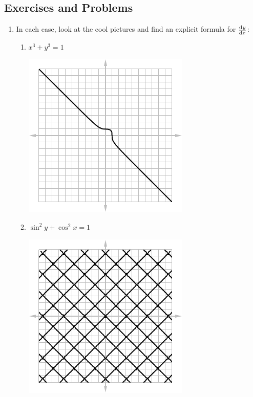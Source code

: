 \subsection{Exercises and Problems}
\begin{enumerate}
  \item In each case, look at the cool pictures and find an explicit formula for $ \od{y}{x} $:
    \begin{multicols}{2}
    \begin{enumerate}
      \item $ x^3 + y^3 = 1 $
            \begin{center}
              \includegraphics[width=0.6\linewidth]{implicit7}
            \end{center}
      \item $ \sin^2 y + \cos^2 x = 1 $
            \begin{center}
              \includegraphics[width=0.6\linewidth]{implicit2}
            \end{center}
      \vfill\null
      \columnbreak

\end{enumerate}
\end{multicols}
\end{enumerate}

